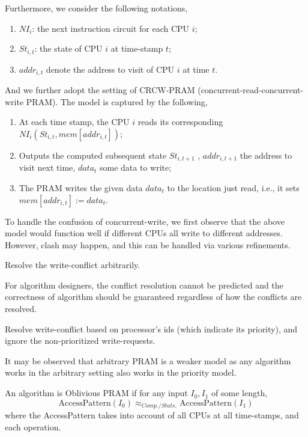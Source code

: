     
 Furthermore, we consider the following notations,\begin{enumerate}
    	\item  $NI_i$: the next instruction circuit for each CPU $i$;
    	\item $St_{i,t}$: the state of CPU $i$ at time-stamp $t$;
    	\item $addr_{i,t}$ denote the address to visit of CPU $i$ at time $t$.
    \end{enumerate} 
    And we further adopt the setting of CRCW-PRAM (concurrent-read-concurrent-write PRAM). The model is captured by the following,\begin{enumerate}
    	\item At each time stamp, the CPU $i$ reads its corresponding $NI_i(St_{i,t}, mem[addr_{i,t}])$;
    	\item Outputs the computed subsequent state $St_{i,t+1}$ , $addr_{i,t+1}$ the address to visit next time, $data_t$ some data to write;
    	\item The PRAM writes the given data $data_t$ to the location just read, i.e., it sets $mem[addr_{i,t}] := data_t$.
     \end{enumerate}
    
    To handle the confusion of concurrent-write, we first observe that the above model would function well if different CPUs all write to different addresses. However, clash may happen, and this can be handled via various refinements.
    
    \begin{definition}
    	Resolve the write-conflict arbitrarily.
    \end{definition}
    For algorithm designers, the conflict resolution cannot be predicted and the correctness of algorithm should be guaranteed regardless of how the conflicts are resolved.
    \begin{definition}
    	Resolve write-conflict based on processor's ids (which indicate its priority), and ignore the non-prioritized write-requests.
    \end{definition}
    
 It may be observed that 
    arbitrary PRAM is a weaker model as any algorithm works in the arbitrary setting also works in the priority model.	
    
    \begin{definition}
    	An algorithm is Oblivious PRAM if for any input $I_0, I_1$ of some length, \[ 
    	\text{AccessPattern}(I_0) \approx_{Comp./Stats.} \text{AccessPattern}(I_1)
    	\]
    	where the AccessPattern takes into account of all CPUs at all time-stamps, and each operation.
    \end{definition}
    
